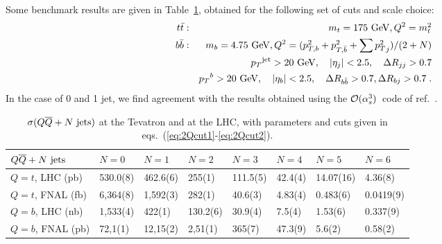 \documentclass[paper]{JHEP3}
\newcommand{\gev}{\mbox{GeV}}
\newcommand{\ccaption}[2]{
    \begin{center}
    \parbox{0.85\textwidth}{
      \caption[#1]{\small{{#2}}}
      }
    \end{center}
    }
\def    \ba             {\begin{eqnarray}}
\def    \ea             {\end{eqnarray}}
\def    \gev            {\mbox{$\mathrm{GeV}$}}
\def    \bbar   {\bar{b}}
\def    \tbar   {\bar{t}}
\def    \Qbar   {\overline{Q}}
\def    \mt             {\mbox{$m_t$}}
\def    \mtsq             {\mbox{$m_t^2$}}
\def    \mb             {\mbox{$m_b$}}
\def    \pt             {\mbox{$p_T$}}
\def    \ptsq           {\mbox{$p^2_T$}}
\def    \ptbsq           {\mbox{$p^2_{T,b}$}}
\def    \ptbbsq           {\mbox{$p^2_{T,\bar{b}}$}}
\def \oacube {\mbox{$ {\cal O}(\alpha_s^3)$}}
\begin{document}
Some benchmark results are given in Table~\ref{tab:QQxs}, obtained
for the following set of cuts and scale choice:
\ba \label{eq:2Qcut1}
t\tbar: && \mt=175~\gev, Q^2=\mtsq
\\
b\bbar: && \mb=4.75~\gev, Q^2=(\ptbsq+\ptbbsq+\sum \ptsq_j)/(2+N)
\\
        && \pt^{\rm jet}>20~\gev, \quad \vert \eta_j\vert < 2.5, \quad \Delta
        R_{jj} >0.7
\\
        && \pt^{b}>20~\gev, \quad \vert \eta_b \vert < 2.5, \quad \Delta
        R_{b\bbar} >0.7, \Delta R_{bj} >0.7 \; .
\label{eq:2Qcut2}
\ea
In the case of 0 and 1 jet, we find agreement with the results obtained
using the \oacube\ code of ref.~\cite{Mangano:jk}.
{\renewcommand{\arraystretch}{1.2}
\begin{table}
\begin{center}
\begin{tabular}{||l|l|l|l|l|l|l|l||}\hline
$Q \Qbar + N~{\rm jets}$  & $N= 0$  & 
$N = 1$ & $N = 2$ & $N = 3$ & $N=4$ & $N=5$ & $N=6$ \\ 
\hline
$Q=t$, LHC (pb)  & 530.0(8) & 462.6(6) & 255(1) & 111.5(5) & 42.4(4)  
& 14.07(16) & 4.36(8) \\ 
\hline
$Q=t$, FNAL (fb) &  6,364(8) &  1,592(3) & 282(1) & 40.6(3) & 4.83(4) & 
0.483(6) & 0.0419(9) \\ 
\hline
$Q=b$, LHC (nb)   &  1,533(4)
& 422(1) & 130.2(6)  & 30.9(4) & 7.5(4) 
& 1.53(6) & 0.337(9) \\ 
\hline
$Q=b$, FNAL (pb)   & 72,1(1) &  12,15(2) & 2,51(1) & 365(7) & 47.3(9) 
& 5.6(2)& 0.58(2)\\ 
\hline
\end{tabular}            
\ccaption{}{\label{tab:QQxs} $\sigma(Q \Qbar + N~{\rm jets})$
at the Tevatron and 
at the LHC, with parameters and cuts given in
eqs.~(\ref{eq:2Qcut1}-\ref{eq:2Qcut2}).}
\end{center}
\end{table}}
\end{document}
